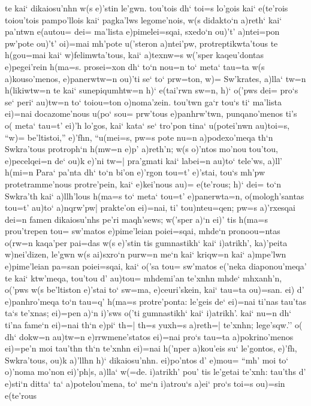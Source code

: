 \documentclass[11pt]{book}
\newcommand {\Spag} {\Npag*{=+1}\Npar{1}\numerus{1}}
\newcommand {\Spar} {\Npar*{=+1}\numerus{1}}
\begin{document}
te kai` dikaiosu'nhn w(s e)'stin le'gwn. tou'tois dh` toi=s lo'gois kai`
e(te'rois toiou'tois pampo'llois kai` pagka'lws legome'nois, w(s didakto`n
a)reth` kai` pa'ntwn e(autou= dei= ma'lista
%
\Spar
%
e)pimelei=sqai, sxedo`n ou)'t' a)ntei=pon pw'pote ou)'t' oi)=mai
mh'pote u('steron a)ntei'pw, protreptikwta'tous te h(gou=mai kai`
w)felimwta'tous, kai` a)texnw=s w('sper kaqeu'dontas e)pegei'rein h(ma=s.
prosei=xon dh` to`n nou=n to` meta` tau=ta w(s a)kouso'menos, e)panerwtw=n
ou)'ti se` to` prw=ton, w)= Sw'krates, a)lla` tw=n h(likiwtw=n te kai`
sunepiqumhtw=n h)` e(tai'rwn sw=n, h)` o('pws dei= pro`s se` peri` au)tw=n
to` toiou=ton o)noma'zein. tou'twn ga`r tou`s ti` ma'lista ei)=nai
docazome'nous u(po` sou= prw'tous e)panhrw'twn, punqano'menos ti's o(
meta` tau=t' ei)'h lo'gos, kai`
\Spar
kata` se` tro'pon tina` u(potei'nwn au)toi=s, ``w)= be'ltistoi,''
e)'fhn, ``u(mei=s, pw=s pote nu=n a)podexo'meqa th`n Swkra'tous
protroph`n h(mw=n e)p' a)reth'n; w(s o)'ntos mo'nou tou'tou, e)pecelqei=n
de` ou)k e)'ni tw=| pra'gmati kai` labei=n au)to` tele'ws, a)ll' h(mi=n
Para` pa'nta dh` to`n bi'on e)'rgon tou=t' e)'stai, tou`s mh'pw
protetramme'nous protre'pein, kai` e)kei'nous au)= e(te'rous; h)` dei=
to`n Swkra'th kai` a)llh'lous h(ma=s to` meta` tou=t' e)panerwta=n, \Spar
o(mologh'santas tou=t' au)to` a)nqrw'pw| prakte'on ei)=nai, ti'
tou)nteu=qen; pw=s a)'rxesqai dei=n famen dikaiosu'nhs pe'ri maqh'sews;
w('sper a)`n ei)' tis h(ma=s prou'trepen tou= sw'matos e)pime'leian
poiei=sqai, mhde`n pronoou=ntas o(rw=n kaqa'per pai=das w(s e)'stin tis
gumnastikh` kai` i)atrikh', ka)'peita w)nei'dizen, le'gwn w(s ai)sxro`n
purw=n me`n kai` kriqw=n kai` a)mpe'lwn e)pime'leian pa=san poiei=sqai,
kai` o('sa tou= sw'matos e('neka diaponou'meqa' te kai` ktw'meqa, tou'tou
d' au)tou= mhdemi'an te'xnhn mhde` mhxanh'n, o('pws w(s be'ltiston e)'stai
to` sw=ma, e)ceuri'skein, kai` tau=ta ou)=san. ei) d' e)panhro'meqa to`n
tau=q'
\Spag
h(ma=s protre'ponta: le'geis de` ei)=nai ti'nas tau'tas ta`s
te'xnas; ei)=pen a)`n i)'sws o('ti gumnastikh` kai` i)atrikh'. kai` nu=n
dh` ti'na fame`n ei)=nai th`n e)pi` th=| th=s yuxh=s a)reth=| te'xnhn;
lege'sqw.'' o( dh` dokw=n au)tw=n e)rrwmene'statos ei)=nai pro`s tau=ta
a)pokrino'menos ei)=pe'n moi tau'thn th`n te'xnhn ei)=nai h('nper
a)kou'eis su` le'gontos, e)'fh, Swkra'tous, ou)k a)'llhn h)`
dikaiosu'nhn. ei)po'ntos d' e)mou= ``mh' moi to` o)'noma mo'non ei)'ph|s,
a)lla` w(=de.
\Spar
i)atrikh' pou' tis le'getai te'xnh: tau'ths d' e)sti`n ditta` ta`
a)potelou'mena, to` me`n i)atrou`s a)ei` pro`s toi=s ou)=sin e(te'rous
\end{document}
